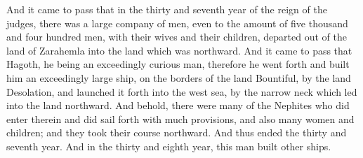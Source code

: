 And it came to pass that in the thirty and seventh year of the reign of the judges, there was a large company of men, even to the amount of five thousand and four hundred men, with their wives and their children, departed out of the land of Zarahemla into the land which was northward.
\bverse \iffalse And it came to pass that Hagoth, he being an exceedingly curious man, therefore he went forth and built him an exceedingly large ship, on the borders of the land Bountiful, by the land Desolation, and launched it forth into the west sea, by the narrow neck which led into the land northward. \fi
And it came to pass that Hagoth, he being an exceedingly curious man, therefore he went forth and built him an exceedingly large ship, on the borders of the land Bountiful, by the land Desolation, and launched it forth into the west sea, by the narrow neck which led into the land northward.
\bverse \iffalse And behold, there were many of the Nephites who did enter therein and did sail forth with much provisions, and also many women and children; and they took their course northward. And thus ended the thirty and seventh year. \fi
And behold, there were many of the Nephites who did enter therein and did sail forth with much provisions, and also many women and children; and they took their course northward. And thus ended the thirty and seventh year.
\bverse \iffalse And in the thirty and eighth year, this man built other ships. \fi
And in the thirty and eighth year, this man built other ships.


